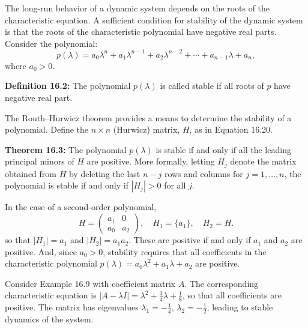 \begin{original}
The long-run behavior of a dynamic system depends on the roots of the characteristic equation. A sufficient condition for stability of the dynamic system is that the roots of the characteristic polynomial have negative real parts. Consider the polynomial:
\[
p(\lambda) = a_0\lambda^n + a_1\lambda^{n-1} + a_2\lambda^{n-2} + \cdots + a_{n-1}\lambda + a_n,
\]
where $a_0 > 0$.

\textbf{Definition 16.2:} The polynomial $p(\lambda)$ is called stable if all roots of $p$ have negative real part.

The Routh--Hurwicz theorem provides a means to determine the stability of a polynomial. Define the $n \times n$ (Hurwicz) matrix, $H$, as in Equation 16.20.

\textbf{Theorem 16.3:} The polynomial $p(\lambda)$ is stable if and only if all the leading principal minors of $H$ are positive. More formally, letting $H_j$ denote the matrix obtained from $H$ by deleting the last $n - j$ rows and columns for $j = 1, \ldots, n$, the polynomial is stable if and only if $|H_j| > 0$ for all $j$.

In the case of a second-order polynomial,
\[
H = \begin{pmatrix} a_1 & 0 \\ a_0 & a_2 \end{pmatrix}, \quad H_1 = \{a_1\}, \quad H_2 = H.
\]
so that $|H_1| = a_1$ and $|H_2| = a_1 a_2$. These are positive if and only if $a_1$ and $a_2$ are positive. And, since $a_0 > 0$, stability requires that all coefficients in the characteristic polynomial $p(\lambda) = a_0\lambda^2 + a_1\lambda + a_2$ are positive.

Consider Example 16.9 with coefficient matrix $A$. The corresponding characteristic equation is $|A - \lambda I| = \lambda^2 + \frac{3}{4}\lambda + \frac{1}{8}$, so that all coefficients are positive. The matrix has eigenvalues $\lambda_1 = -\frac{1}{4}$, $\lambda_2 = -\frac{1}{2}$, leading to stable dynamics of the system.
\end{original}
